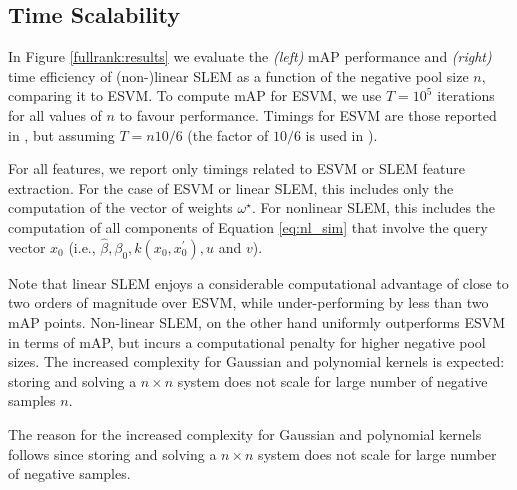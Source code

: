 
\subsection{Time Scalability} \label{time-scale}
In Figure \ref{fullrank:results} we evaluate the \textit{(left)} mAP performance and \textit{(right)} time efficiency of (non-)linear SLEM as a function of the negative pool size $n$, comparing it to ESVM. To compute mAP for ESVM, we use $T=10^5$ iterations for all values of $n$ to favour performance. Timings for ESVM are those reported in \cite{ZePe15}, but assuming $T=n 10/6$ (the factor of $10/6$ is used in \cite{ZePe15}).

For all features, we report only timings related to ESVM or SLEM feature extraction. For the case of ESVM or linear SLEM, this includes only the computation of the vector of weights $\omega^\star$. For nonlinear SLEM, this includes the computation of all components of Equation \eqref{eq:nl_sim} that involve the query vector $x_0$ (i.e., $\hat \beta, \beta_0, k(x_0, x_0^\prime), u$ and $v$). 

Note that linear SLEM enjoys a considerable computational advantage of close to two orders of magnitude over ESVM, while under-performing by less than two mAP points. Non-linear SLEM, on the other hand uniformly outperforms ESVM in terms of mAP, but incurs a computational penalty for higher negative pool sizes. The increased complexity for Gaussian and polynomial kernels is expected: storing and solving a $n\times n$ system does not scale for large number of negative samples $n$.



The reason for the increased complexity for Gaussian and polynomial kernels follows since storing and solving a $n\times n$ system does not scale for large number of negative samples.

